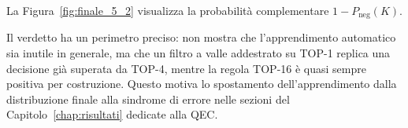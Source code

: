 \begin{onehalfspace}
La Figura~\ref{fig:finale_5_2} visualizza la probabilità complementare $1-P_{\mathrm{neg}}(K)$.

Il verdetto ha un perimetro preciso: non mostra che l'apprendimento
automatico sia inutile in generale, ma che un filtro a valle addestrato
su TOP-1 replica una decisione già superata da TOP-4, mentre la regola
TOP-16 è quasi sempre positiva per costruzione. Questo motiva lo
spostamento dell'apprendimento dalla distribuzione finale alla sindrome
di errore nelle sezioni del Capitolo~\ref{chap:risultati} dedicate alla \ac{QEC}.

\end{onehalfspace}
